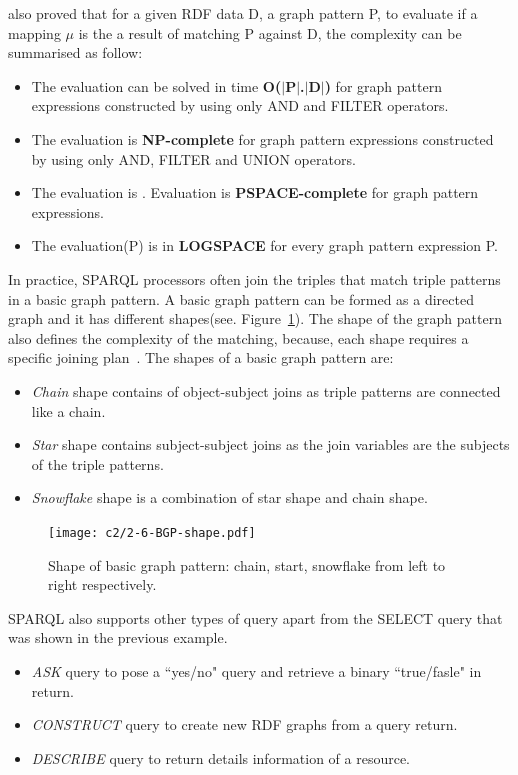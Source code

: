 {\cite{Perez:2009} also proved that for a given RDF data D, a graph pattern P, to evaluate if a mapping $\mu$ is the a result of matching 
P against D, the complexity can be summarised as follow:
\begin{itemize}[noitemsep,nolistsep]
\item The evaluation can be solved in time \textbf{O($|$P$|$.$|$D$|$)} for graph pattern expressions constructed by using only AND and FILTER operators.
\item The evaluation is \textbf{NP-complete} for graph pattern expressions constructed by using only AND, FILTER and UNION operators.
\item The evaluation is . Evaluation is \textbf{PSPACE-complete} for graph pattern expressions.
\item The evaluation(P) is in \textbf{{LOGSPACE}} for every graph pattern expression P.
\end{itemize}

In practice, SPARQL processors often join the triples that match triple patterns in a basic graph pattern. 
A basic graph pattern can be formed as a directed graph and it has different shapes(see. Figure~\ref{fig:2.6-bgp}). 
The shape of the graph pattern also defines the complexity of the matching, because, each shape requires a specific joining plan~\citep{Hartig:2014}.
The shapes of a basic graph pattern are: 
\begin{itemize}[noitemsep,nolistsep]
\item \textit{Chain} shape contains of object-subject joins as triple patterns are connected like a chain.
\item \textit{Star} shape contains subject-subject joins as the join variables are the subjects of the triple patterns.
\item \textit{Snowflake} shape is a combination of star shape and chain shape.
\end{itemize}

\begin{figure}[ht!]
	\centering
	\texttt{[image: c2/2-6-BGP-shape.pdf]}
	\caption{Shape of basic graph pattern: chain, start, snowflake from left to right respectively.}
	\label{fig:2.6-bgp}
\end{figure}

SPARQL also supports other types of query apart from the SELECT query that was shown in the previous example. 
\begin{itemize}[noitemsep,nolistsep]
\item \textit{ASK} query to pose a ``yes/no" query and retrieve a binary ``true/fasle" in return.
\item \textit{CONSTRUCT} query to create new RDF graphs from a query return.
\item \textit{DESCRIBE} query to return details information of a resource.
\end{itemize}

}
